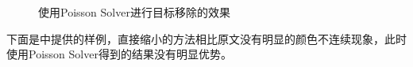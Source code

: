 \documentclass[twoside,a4paper,4pt]{article}
\begin{document}
\begin{figure}[H]
{    }
    \caption{使用Poisson Solver进行目标移除的效果}
    \label{fig:poisson_removal}
\end{figure}\par
下面是\cite{avidan2007seam}中提供的样例，直接缩小的方法相比原文没有明显的颜色不连续现象，此时使用Poisson Solver得到的结果没有明显优势。
\end{document}
